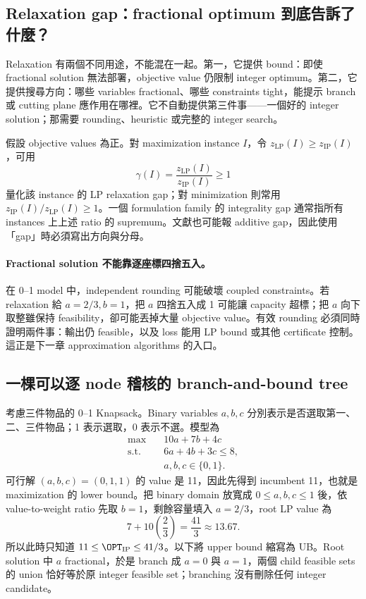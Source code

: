\documentclass[11pt,a4paper,oneside,openany]{book}
\begin{document}
\subsection{Relaxation gap：fractional optimum 到底告訴了什麼？}
Relaxation 有兩個不同用途，不能混在一起。第一，它提供 bound：即使 fractional solution 無法部署，objective value 仍限制 integer optimum。第二，它提供搜尋方向：哪些 variables fractional、哪些 constraints tight，能提示 branch 或 cutting plane 應作用在哪裡。它不自動提供第三件事——一個好的 integer solution；那需要 rounding、heuristic 或完整的 integer search。

\begin{definition}
假設 objective values 為正。對 maximization instance $I$，令 $z_{\mathrm{LP}}(I)\ge z_{\mathrm{IP}}(I)$，可用
\[
 \gamma(I)=\frac{z_{\mathrm{LP}}(I)}{z_{\mathrm{IP}}(I)}\ge1
\]
量化該 instance 的 LP relaxation gap；對 minimization 則常用 $z_{\mathrm{IP}}(I)/z_{\mathrm{LP}}(I)\ge1$。一個 formulation family 的 integrality gap 通常指所有 instances 上上述 ratio 的 supremum。文獻也可能報 additive gap，因此使用「gap」時必須寫出方向與分母。
\end{definition}

\paragraph{Fractional solution 不能靠逐座標四捨五入。}
在 0--1 model 中，independent rounding 可能破壞 coupled constraints。若 relaxation 給 $a=2/3,b=1$，把 $a$ 四捨五入成 1 可能讓 capacity 超標；把 $a$ 向下取整雖保持 feasibility，卻可能丟掉大量 objective value。有效 rounding 必須同時證明兩件事：輸出仍 feasible，以及 loss 能用 LP bound 或其他 certificate 控制。這正是下一章 approximation algorithms 的入口。

\subsection{一棵可以逐 node 稽核的 branch-and-bound tree}
考慮三件物品的 0--1 Knapsack。Binary variables $a,b,c$ 分別表示是否選取第一、二、三件物品；1 表示選取，0 表示不選。模型為
\begin{align}
\max\quad &10a+7b+4c \label{eq:bb-knapsack}\\
\text{s.t.}\quad &6a+4b+3c\le8,\nonumber\\
&a,b,c\in\{0,1\}.\nonumber
\end{align}
可行解 $(a,b,c)=(0,1,1)$ 的 value 是 11，因此先得到 incumbent 11，也就是 maximization 的 lower bound。把 binary domain 放寬成 $0\le a,b,c\le1$ 後，依 value-to-weight ratio 先取 $b=1$，剩餘容量填入 $a=2/3$，root LP value 為
\[
 7+10\left(\frac23\right)=\frac{41}{3}\approx13.67.
\]
所以此時只知道 $11\le\OPT_{\mathrm{IP}}\le41/3$。以下將 upper bound 縮寫為 UB。Root solution 中 $a$ fractional，於是 branch 成 $a=0$ 與 $a=1$，兩個 child feasible sets 的 union 恰好等於原 integer feasible set；branching 沒有刪除任何 integer candidate。
\end{document}

